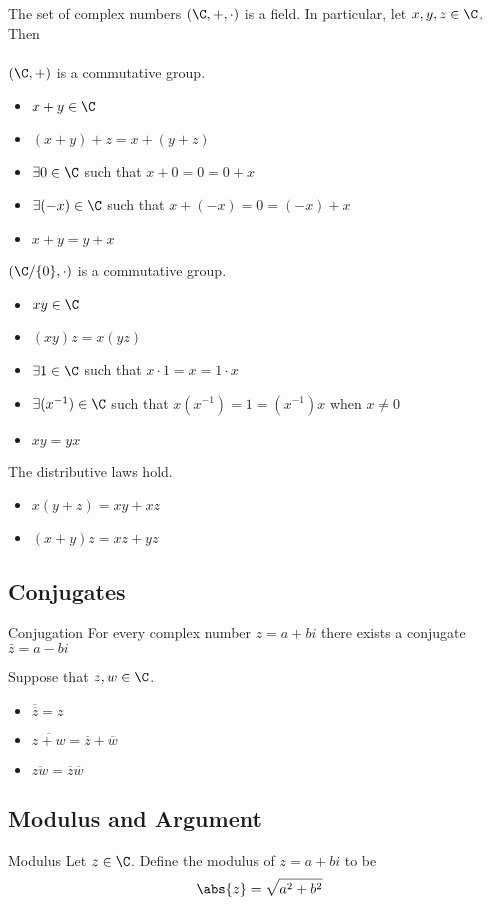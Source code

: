 \begin{prp}{}{} The set of complex numbers $(\C,+,\cdot)$ is a field. In particular, let $x,y,z\in\C$. Then\\~\\
$(\C,+)$ is a commutative group. 
\begin{itemize}
\item $x+y\in\C$
\item $(x+y)+z=x+(y+z)$
\item $\exists 0\in\C$ such that $x+0=0=0+x$
\item $\exists(-x)\in\C$ such that $x+(-x)=0=(-x)+x$
\item $x+y=y+x$
\end{itemize}
$(\C/\{0\},\cdot)$ is a commutative group. 
\begin{itemize}
\item $xy\in\C$
\item $(xy)z=x(yz)$
\item $\exists 1\in\C$ such that $x\cdot1=x=1\cdot x$
\item $\exists (x^{-1})\in\C$ such that $x(x^{-1})=1=(x^{-1})x$ when $x\neq0$
\item $xy=yx$
\end{itemize}
The distributive laws hold. 
\begin{itemize}
\item $x(y+z)=xy+xz$
\item $(x+y)z=xz+yz$
\end{itemize}
\end{prp}

\subsection{Conjugates}
\begin{defn}{Conjugation}{} For every complex number $z=a+bi$ there exists a conjugate $\bar{z}=a-bi$
\end{defn}

\begin{prp}{}{} Suppose that $z,w\in\C$. 
\begin{itemize}
\item $\overline{\overline{z}}=z$
\item $\overline{z+w}=\overline{z}+\overline{w}$
\item $\overline{zw}=\overline{z}\overline{w}$
\end{itemize}
\end{prp}


\subsection{Modulus and Argument}
\begin{defn}{Modulus}{} Let $z\in\C$. Define the modulus of $z=a+bi$ to be $$\abs{z}=\sqrt{a^2+b^2}$$
\end{defn}

